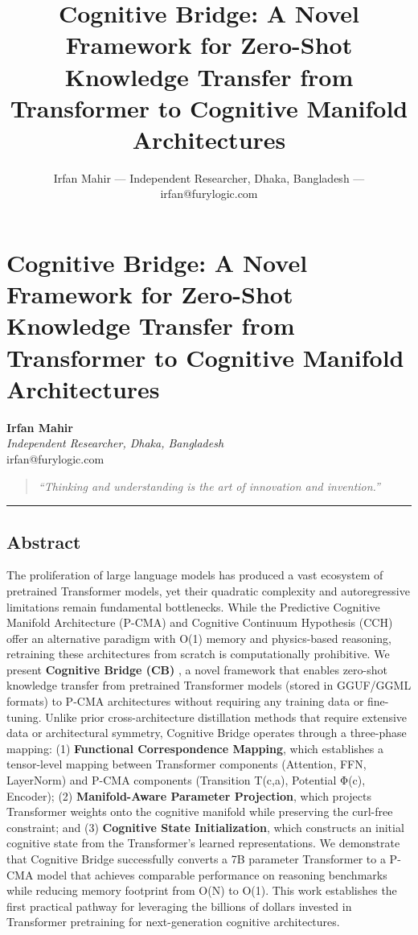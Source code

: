 \documentclass[
  11pt,
  a4paper,
]{article}
\title{Cognitive Bridge: A Novel Framework for Zero-Shot Knowledge
Transfer from Transformer to Cognitive Manifold Architectures}
\author{Irfan Mahir --- Independent Researcher, Dhaka, Bangladesh ---
irfan@furylogic.com}
\date{}
\begin{document}
\maketitle

{
\hypersetup{linkcolor=}
\setcounter{tocdepth}{3}
\tableofcontents
}
\section{Cognitive Bridge: A Novel Framework for Zero-Shot Knowledge
Transfer from Transformer to Cognitive Manifold
Architectures}\label{cognitive-bridge-a-novel-framework-for-zero-shot-knowledge-transfer-from-transformer-to-cognitive-manifold-architectures}

\textbf{Irfan Mahir}\\
\emph{Independent Researcher, Dhaka, Bangladesh}\\
irfan@furylogic.com

\begin{quote}
\emph{``Thinking and understanding is the art of innovation and
invention.''}
\end{quote}

\begin{center}\rule{0.5\linewidth}{0.5pt}\end{center}

\subsection{Abstract}\label{abstract}

The proliferation of large language models has produced a vast ecosystem
of pretrained Transformer models, yet their quadratic complexity and
autoregressive limitations remain fundamental bottlenecks. While the
Predictive Cognitive Manifold Architecture (P-CMA) and Cognitive
Continuum Hypothesis (CCH) offer an alternative paradigm with O(1)
memory and physics-based reasoning, retraining these architectures from
scratch is computationally prohibitive. We present \textbf{Cognitive
Bridge (CB)} , a novel framework that enables zero-shot knowledge
transfer from pretrained Transformer models (stored in GGUF/GGML
formats) to P-CMA architectures without requiring any training data or
fine-tuning. Unlike prior cross-architecture distillation methods that
require extensive data or architectural symmetry, Cognitive Bridge
operates through a three-phase mapping: (1) \textbf{Functional
Correspondence Mapping}, which establishes a tensor-level mapping
between Transformer components (Attention, FFN, LayerNorm) and P-CMA
components (Transition T(c,a), Potential Φ(c), Encoder); (2)
\textbf{Manifold-Aware Parameter Projection}, which projects Transformer
weights onto the cognitive manifold while preserving the curl-free
constraint; and (3) \textbf{Cognitive State Initialization}, which
constructs an initial cognitive state from the Transformer's learned
representations. We demonstrate that Cognitive Bridge successfully
converts a 7B parameter Transformer to a P-CMA model that achieves
comparable performance on reasoning benchmarks while reducing memory
footprint from O(N) to O(1). This work establishes the first practical
pathway for leveraging the billions of dollars invested in Transformer
pretraining for next-generation cognitive architectures.
\end{document}

